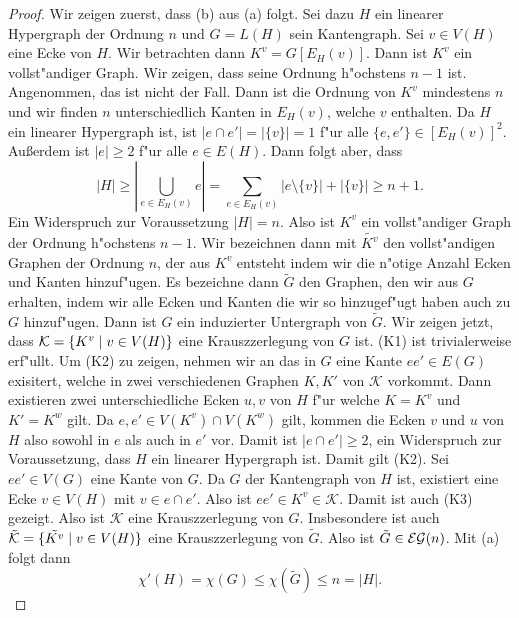\begin{proof}
  Wir zeigen zuerst, dass (b) aus (a) folgt. Sei dazu $H$ ein linearer Hypergraph der Ordnung $n$ und $G=L(H)$ sein Kantengraph. Sei $v\in V(H)$ eine Ecke von $H$. Wir betrachten dann $K^{v} = G[E_H(v)]$. Dann ist $K^{v}$ ein vollst"andiger Graph. Wir zeigen, dass seine Ordnung h"ochstens $n-1$ ist. Angenommen, das ist nicht der Fall. Dann ist die Ordnung von $K^{v}$ mindestens $n$ und wir finden $n$ unterschiedlich Kanten in $E_H(v)$, welche $v$ enthalten. 
  Da $H$ ein linearer Hypergraph ist, ist $|e\cap e'| = |\{ v \}| = 1$ f"ur alle $\{e,e'\} \in [E_H(v)]^{2}$. Au{\ss}erdem ist $|e| \geq 2$ f"ur alle $e\in E(H)$. 
  Dann folgt aber, dass $$|H| \geq |\bigcup\limits_{e\in E_H(v)} e| = \sum\limits_{e\in E_{H}(v)} |e\setminus \{v\}|+ | \{v\}| \geq n+1.$$ 
  Ein Widerspruch zur Voraussetzung $|H| = n$. Also ist $K^{v}$ ein vollst"andiger Graph der Ordnung h"ochstens $n-1$. Wir bezeichnen dann mit $\tilde{K^{v}}$ den vollst"andigen Graphen der Ordnung $n$, der aus $K^{v}$ entsteht indem wir die n"otige Anzahl Ecken und Kanten hinzuf"ugen. Es bezeichne dann $\tilde{G}$ den Graphen, den wir aus $G$ erhalten, indem wir alle Ecken und Kanten die wir so hinzugef"ugt haben auch zu $G$ hinzuf"ugen. 
  Dann ist $G$ ein induzierter Untergraph von $\tilde{G}$. 
  Wir zeigen jetzt, dass $\mathcal{K}= \{K^{v} \;|\; v\in V(H) \}$ eine Krauszzerlegung von $G$ ist. 
  (K1) ist trivialerweise erf"ullt. Um (K2) zu zeigen, nehmen wir an das in $G$ eine Kante $ee'\in E(G)$ exisitert, welche in zwei verschiedenen Graphen $K,K'$ von $\mathcal{K}$ vorkommt.
  Dann existieren zwei unterschiedliche Ecken $u,v$ von $H$ f"ur welche $K= K^{v}$ und $K' = K^{w}$ gilt. 
  Da $e,e'\in V(K^{v}) \cap V(K^{w})$ gilt, kommen die Ecken $v$ und $u$ von $H$ also sowohl in $e$ als auch in $e'$ vor. Damit ist $|e\cap e'| \geq 2$, ein Widerspruch zur Voraussetzung, dass $H$ ein linearer Hypergraph ist. Damit gilt (K2).
  Sei $ee'\in V(G)$ eine Kante von $G$. Da $G$ der Kantengraph von $H$ ist, existiert eine Ecke $v\in V(H)$ mit $ v\in e\cap e'$. 
  Also ist $ee'\in K^{v}\in \mathcal{K}$. Damit ist auch (K3) gezeigt. Also ist $\mathcal{K}$ eine Krauszzerlegung von $G$. Insbesondere ist auch $\tilde{\mathcal{K}} = \{\tilde{K^{v}} \;|\; v\in V(H) \}$ eine Krauszzerlegung von $\tilde{G}$. Also ist $\tilde{G}\in {\cal EG}(n)$. Mit (a) folgt dann $$ \chi'(H) = \chi(G) \leq \chi(\tilde{G}) \leq n = |H|.$$
  

\end{proof}
